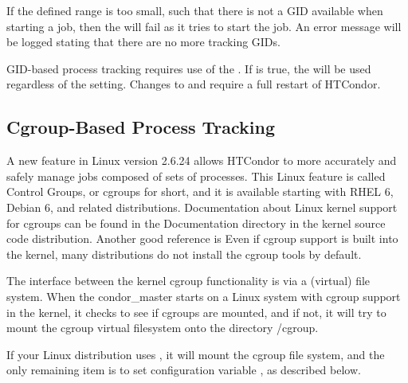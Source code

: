 If the defined range is too small, such that there is not a GID available
when starting a job,
then the  will fail as it tries to start the job.
An error message will be logged stating that there are no more tracking GIDs.

GID-based process tracking requires use of the . If
 is true, the  will
be used regardless of the  setting.  Changes to
 and  require
a full restart of HTCondor.

\subsection{\label{sec:CGroupTracking}Cgroup-Based Process Tracking} 

A new feature in Linux version 2.6.24 allows HTCondor to more accurately 
and safely manage jobs composed of sets of processes.  This Linux 
feature is called Control Groups, or cgroups for short, and it is 
available starting with RHEL 6, Debian 6, and related distributions.  
Documentation about Linux kernel support for cgroups can be found 
in the Documentation directory in the kernel source code distribution.
Another good reference is 
Even if cgroup support is built into the kernel, 
many distributions do not install the cgroup tools by default.

The interface between the kernel cgroup functionality is via a (virtual) 
file system.  When the condor\_master starts on a Linux system with
cgroup support in the kernel, it checks to see if cgroups are mounted,
and if not, it will try to mount the cgroup virtual
filesystem onto the directory /cgroup.

If your Linux distribution uses , 
it will mount the cgroup file system, 
and the only remaining item is to set configuration variable
, as described below.





